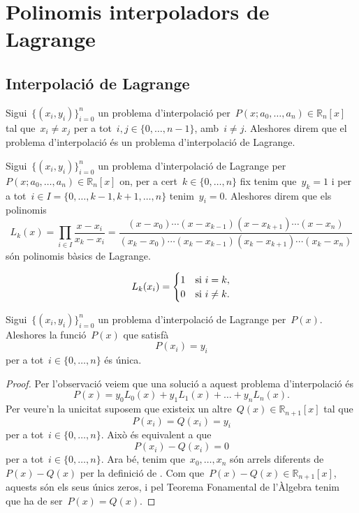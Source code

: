 \documentclass[../../main.tex]{subfiles}
\begin{document}
\section{Polinomis interpoladors de Lagrange}
	\subsection{Interpolació de Lagrange}
	\begin{definition}
		\label{def:problema d'interpolació de Lagrange}
		Sigui~\(\{(x_{i},y_{i})\}_{i=0}^{n}\) un problema d'interpolació per~\(P(x;a_{0},\dots,a_{n})\in\mathbb{R}_{n}[x]\) tal que~\(x_{i}\neq x_{j}\) per a tot~\(i,j\in\{0,\dots,n-1\}\), amb~\(i\neq j\).
		Aleshores direm que el problema d'interpolació és un problema d'interpolació de Lagrange.
	\end{definition}
	\begin{definition}
		\label{def:problema polinomis bàsics de Lagrange}
		Sigui~\(\{(x_{i},y_{i})\}_{i=0}^{n}\) un problema d'interpolació de Lagrange per~\(P(x;a_{0},\dots,a_{n})\in\mathbb{R}_{n}[x]\) on, per a cert~\(k\in\{0,\dots,n\}\) fix tenim que~\(y_{k}=1\) i per a tot~\(i\in I=\{0,\dots,k-1,k+1,\dots,n\}\) tenim~\(y_{i}=0\).
		Aleshores direm que els polinomis
		\[
		    L_{k}(x)=\prod_{i\in I}\frac{x-x_{i}}{x_{k}-x_{i}}=\frac{(x-x_{0})\cdots(x-x_{k-1})(x-x_{k+1})\cdots(x-x_{n})}{(x_{k}-x_{0})\cdots(x_{k}-x_{k-1})(x_{k}-x_{k+1})\cdots(x_{k}-x_{n})}
		\]
		són polinomis bàsics de Lagrange.
	\end{definition}
	\begin{observation}\label{obs:polinomis bàsics de Lagrange cases}
		\[L_{k}(x_{i})=\begin{cases}
		1&\textup{si }i=k,\\
		0&\textup{si }i\neq k.
		\end{cases}\]
	\end{observation}
	\begin{proposition}\label{prop:unicitat interpolació de Lagrange}
		Sigui~\(\{(x_{i},y_{i})\}_{i=0}^{n}\) un problema d'interpolació de Lagrange per~\(P(x)\).
		Aleshores la funció~\(P(x)\) que satisfà
		\[
		    P(x_{i})=y_{i}
		\]
		per a tot~\(i\in\{0,\dots,n\}\) és única.
		\begin{proof}
			Per l'observació  veiem que una solució a aquest problema d'interpolació és
			\[
			    P(x)=y_{0}L_{0}(x)+y_{1}L_{1}(x)+\dots+y_{n}L_{n}(x).
			\]
			Per veure'n la unicitat suposem que existeix un altre~\(Q(x)\in\mathbb{R}_{n+1}[x]\) tal que
			\[
			    P(x_{i})=Q(x_{i})=y_{i}
			\]
			per a tot~\(i\in\{0,\dots,n\}\).
			Això és equivalent a que
			\[
			    P(x_{i})-Q(x_{i})=0
			\]
			per a tot~\(i\in\{0,\dots,n\}\).
			Ara bé, tenim que~\(x_{0},\dots,x_{n}\) són arrels diferents de~\(P(x)-Q(x)\) per la definició de .
			Com que~\(P(x)-Q(x)\in\mathbb{R}_{n+1}[x]\), aquests són els seus únics zeros, i pel Teorema Fonamental de l'Àlgebra tenim que ha de ser~\(P(x)=Q(x)\).
		\end{proof}
	\end{proposition}
\end{document}
